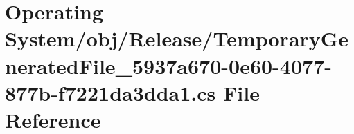 \hypertarget{_operating_01_system_2obj_2_release_2_temporary_generated_file__5937a670-0e60-4077-877b-f7221da3dda1_8cs}{}\section{Operating System/obj/\+Release/\+Temporary\+Generated\+File\+\_\+5937a670-\/0e60-\/4077-\/877b-\/f7221da3dda1.cs File Reference}
\label{_operating_01_system_2obj_2_release_2_temporary_generated_file__5937a670-0e60-4077-877b-f7221da3dda1_8cs}
